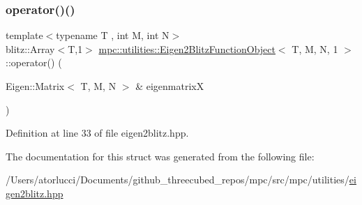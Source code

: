 \subsubsection{\texorpdfstring{operator()()}{operator()()}}
{\footnotesize\ttfamily template$<$typename T , int M, int N$>$ \\
blitz\+::\+Array$<$T,1$>$ \mbox{\hyperlink{structmpc_1_1utilities_1_1_eigen2_blitz_function_object}{mpc\+::utilities\+::\+Eigen2\+Blitz\+Function\+Object}}$<$ T, M, N, 1 $>$\+::operator() (\begin{DoxyParamCaption}\item[{Eigen\+::\+Matrix$<$ T, M, N $>$ \&}]{eigenmatrixX }\end{DoxyParamCaption})\hspace{0.3cm}{\ttfamily [inline]}}



Definition at line 33 of file eigen2blitz.\+hpp.



The documentation for this struct was generated from the following file\+:\begin{DoxyCompactItemize}
\item 
/\+Users/atorlucci/\+Documents/github\+\_\+threecubed\+\_\+repos/mpc/src/mpc/utilities/\mbox{\hyperlink{eigen2blitz_8hpp}{eigen2blitz.\+hpp}}\end{DoxyCompactItemize}
